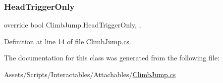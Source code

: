 \subsubsection{\texorpdfstring{Head\+Trigger\+Only}{HeadTriggerOnly}}
{\footnotesize\ttfamily override bool Climb\+Jump.\+Head\+Trigger\+Only\hspace{0.3cm}{\ttfamily [get]}, {\ttfamily [set]}, {\ttfamily [protected]}}



Definition at line 14 of file Climb\+Jump.\+cs.



The documentation for this class was generated from the following file\+:\begin{DoxyCompactItemize}
\item 
Assets/\+Scripts/\+Interactables/\+Attachables/\mbox{\hyperlink{_climb_jump_8cs}{Climb\+Jump.\+cs}}\end{DoxyCompactItemize}
